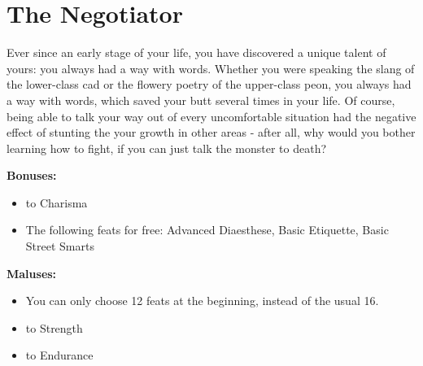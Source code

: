 \section{The Negotiator}
Ever since an early stage of your life, you have discovered a unique talent of yours: you always had a way with words. Whether you were speaking the slang of the lower-class cad or the flowery poetry of the upper-class peon, you always had a way with words, which saved your butt several times in your life. Of course, being able to talk your way out of every uncomfortable situation had the negative effect of stunting the your growth in other areas - after all, why would you bother learning how to fight, if you can just talk the monster to death?


\textbf{Bonuses:}
\begin{itemize}
	\item {} to Charisma
	\item The following feats for free: Advanced Diaesthese, Basic Etiquette, Basic Street Smarts
\end{itemize}
\textbf{Maluses:}
\begin{itemize}
	\item You can only choose 12 feats at the beginning, instead of the usual 16.
	\item {} to Strength
	\item {} to Endurance
\end{itemize}
